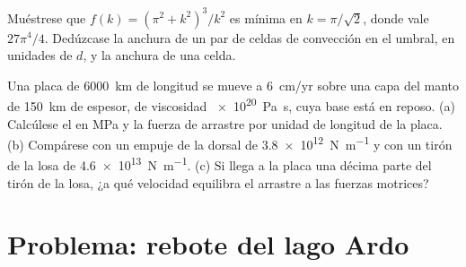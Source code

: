\begin{exercise}[$\star\star\star$]\label{exo:b3:mantle-convection:11}
Muéstrese que $f(k) = (\pi^2 + k^2)^3/k^2$ es mínima en $k = \pi/\sqrt2$, donde
vale $27\pi^4/4$. Dedúzcase la anchura de un par de celdas de convección en el
umbral, en unidades de $d$, y la anchura de una celda.
\end{exercise}

\begin{exercise}[$\star\star\star$]\label{exo:b3:mantle-convection:12}
Una placa de \qty{6000}{km} de longitud se mueve a \qty{6}{cm/yr} sobre una capa del manto
de \qty{150}{km} de espesor, de viscosidad \qty{e20}{Pa.s}, cuya base está en reposo. (a)
Calcúlese el  en \unit{MPa} y la fuerza de arrastre por unidad de longitud de la placa.
(b) Compárese con un empuje de la dorsal de \qty{3.8e12}{N.m^{-1}} y con un tirón de la losa de
\qty{4.6e13}{N.m^{-1}}. (c) Si llega a la placa una décima parte del tirón de la losa,
¿a qué velocidad equilibra el arrastre a las fuerzas motrices?
\end{exercise}

\section{Problema: rebote del lago Ardo}

